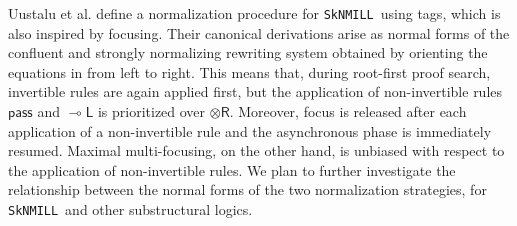 \documentclass[runningheads]{llncs}
\newcommand{\tr}{\otimes \mathsf{R}}
\newcommand{\lleft}{{\multimap}\mathsf{L}}
\newcommand{\pass}{\mathsf{pass}}
\newcommand{\otR}{\tr}
\newcommand{\lolliL}{\lleft}
\newcommand{\SkNMILL}{\texttt{SkNMILL}}
\newcommand{\focus}{\mathsf{focus}}
\begin{document}
Uustalu et al. \cite{UVW:protsn} define a normalization procedure for \SkNMILL\ using tags, which is also inspired by focusing. Their canonical derivations arise as normal forms of the confluent and strongly normalizing rewriting system obtained by orienting the equations in  from left to right. This means that, during root-first proof search, invertible rules are again applied first, but the application of non-invertible rules $\pass$ and $\lolliL$ is prioritized over $\otR$. Moreover, focus is released after each application of a non-invertible rule and the asynchronous phase is immediately resumed. Maximal multi-focusing, on the other hand, is unbiased with respect to the application of non-invertible rules. We plan to further investigate the relationship between the normal forms of the two normalization strategies, for \SkNMILL\ and other substructural logics.






\end{document}
